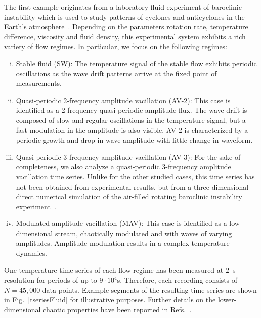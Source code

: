 \documentclass[aip,cha,reprint,nofootinbib]{revtex4-1}
\begin{document}
The first example originates from a laboratory fluid experiment of baroclinic instability which is used to study patterns of cyclones and anticyclones in the Earth's atmosphere~\cite{Read_jfm_1992,ZouEPJST2008}. Depending on the parameters rotation rate, temperature difference, viscosity and fluid density, this experimental system exhibits a rich variety of flow regimes. In particular, we focus on the following regimes: 
\begin{enumerate}[(i)]
\item {Stable fluid (SW):} The temperature signal of the stable flow exhibits periodic oscillations as the wave drift patterns arrive at the fixed point of measurements. 
\item {Quasi-periodic 2-frequency amplitude vacillation (AV-2):} This case is identified as a 2-frequency quasi-periodic amplitude flux. The wave drift is composed of slow and regular oscillations in the temperature signal, but a fast modulation in the amplitude is also visible. AV-2 is characterized by a periodic growth and drop in wave amplitude with little change in waveform. 
\item {Quasi-periodic 3-frequency amplitude vacillation (AV-3):} For the sake of completeness, we also analyze a quasi-periodic 3-frequency amplitude vacillation time series. Unlike for the other studied cases, this time series has not been obtained from experimental results, but from a three-dimensional direct numerical simulation of the air-filled rotating baroclinic instability experiment~\cite{Read_jfm_1992}. 
\item {Modulated amplitude vacillation (MAV):} This case is identified as a low-dimensional stream, chaotically modulated and with waves of varying amplitudes. Amplitude modulation results in a complex temperature dynamics.
\end{enumerate}
{\color{red}One temperature time series of each flow regime has been measured at $2$~s resolution for periods of up to $9 \cdot 10^4$s. Therefore, each recording consists of $N = 45,000$ data points. Example segments of the resulting time series are shown in Fig.~\ref{tseriesFluid} for illustrative purposes. Further details on the lower-dimensional chaotic properties have been reported in Refs.~\cite{Read_jfm_1992,thiel2004a}. }
\end{document}
